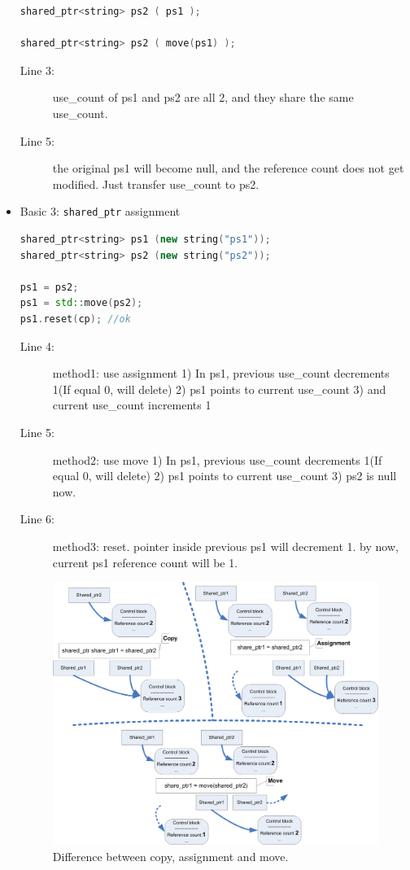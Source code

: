 \documentclass[a4paper,11pt,twoside]{book}
\begin{document}
\begin{itemize}
\begin{lstlisting}[frame=single, language=c++, mathescape=true]
shared_ptr<string> ps2 ( ps1 );

shared_ptr<string> ps2 ( move(ps1) );
\end{lstlisting}
\begin{description}
	\item[Line 3:] use\_count of ps1 and ps2 are all 2, and they share the same use\_count.
	\item[Line 5:] the original ps1 will become null, and the reference count does not get modified. Just transfer use\_count to ps2. 
\end{description}

\item Basic 3: \texttt{shared\_ptr} assignment
\begin{lstlisting}[frame=single, language=c++, mathescape=true]
shared_ptr<string> ps1 (new string("ps1"));
shared_ptr<string> ps2 (new string("ps2"));

ps1 = ps2;
ps1 = std::move(ps2);
ps1.reset(cp); //ok
\end{lstlisting}
\begin{description}
	\item[Line 4:] method1: use assignment  1) In ps1, previous use\_count decrements 1(If equal 0, will delete) 2) ps1 points to current use\_count 3) and current use\_count increments 1
	
	\item[Line 5:] method2: use move 1) In ps1, previous use\_count decrements 1(If equal 0, will delete) 2) ps1 points to current use\_count 3) ps2 is null now. 
	
	\item[Line 6:] method3: reset. pointer inside previous ps1 will decrement 1. by now, current ps1 reference count will be 1.
\end{description}

\begin{figure}[h]
	\centering
	\includegraphics[width=0.9\linewidth]{pics/shared_ptr.png}
	\caption{Difference between copy, assignment and move.}
	\label{fig:sharedptr}
\end{figure}



\end{itemize}
\end{document}
